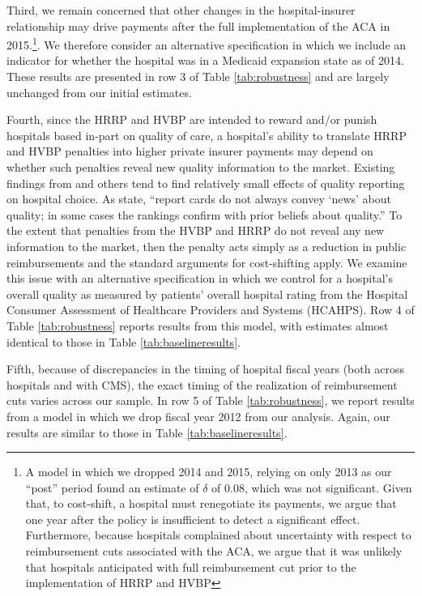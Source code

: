 \documentclass[12pt]{article}
\begin{document}
Third, we remain concerned that other changes in the hospital-insurer relationship may drive payments after the full implementation of the ACA in 2015.\footnote{A model in which we dropped 2014 and 2015, relying on only 2013 as our ``post'' period found an estimate of $\delta$ of 0.08, which was not significant.  Given that, to cost-shift, a hospital must renegotiate its payments, we argue that one year after the policy is insufficient to detect a significant effect.  Furthermore, because hospitals complained about uncertainty with respect to reimbursement cuts associated with the ACA, we argue that it was unlikely that hospitals anticipated with full reimbursement cut prior to the implementation of HRRP and HVBP}. We therefore consider an alternative specification in which we include an indicator for whether the hospital was in a Medicaid expansion state as of 2014. These results are presented in row 3 of Table \ref{tab:robustness} and are largely unchanged from our initial estimates.

Fourth, since the HRRP and HVBP are intended to reward and/or punish hospitals based in-part on quality of care, a hospital's ability to translate HRRP and HVBP penalties into higher private insurer payments may depend on whether such penalties reveal new quality information to the market. Existing findings from \cite{dranove2008} and others tend to find relatively small effects of quality reporting on hospital choice. As \cite{dranove2008} state, ``report cards do not always convey `news' about quality; in some cases the rankings confirm with prior beliefs about quality.'' To the extent that penalties from the HVBP and HRRP do not reveal any new information to the market, then the penalty acts simply as a reduction in public reimbursements and the standard arguments for cost-shifting apply. We examine this issue with an alternative specification in which we control for a hospital's overall quality as measured by patients' overall hospital rating from the Hospital Consumer Assessment of Healthcare Providers and Systems (HCAHPS).  Row 4 of Table \ref{tab:robustness} reports results from this model, with estimates almost identical to those in Table \ref{tab:baselineresults}.

Fifth, because of discrepancies in the timing of hospital fiscal years (both across hospitals and with CMS), the exact timing of the realization of reimbursement cuts varies across our sample. In row 5 of Table \ref{tab:robustness}, we report results from a model in which we drop fiscal year 2012 from our analysis. Again, our results are similar to those in Table \ref{tab:baselineresults}.
\end{document}
